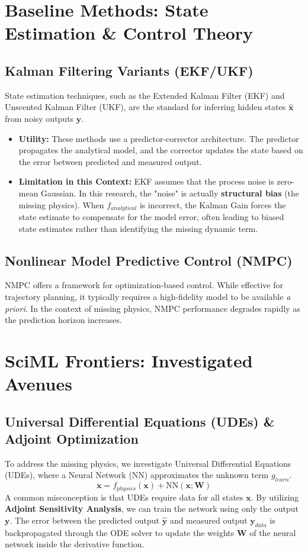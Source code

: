 \documentclass[11pt]{article}
\begin{document}
\section{Baseline Methods: State Estimation \& Control Theory}

\subsection{Kalman Filtering Variants (EKF/UKF)}
State estimation techniques, such as the Extended Kalman Filter (EKF) and Unscented Kalman Filter (UKF), are the standard for inferring hidden states $\hat{\mathbf{x}}$ from noisy outputs $\mathbf{y}$.
\begin{itemize}
    \item \textbf{Utility:} These methods use a predictor-corrector architecture. The predictor propagates the analytical model, and the corrector updates the state based on the error between predicted and measured output.
    \item \textbf{Limitation in this Context:} EKF assumes that the process noise is zero-mean Gaussian. In this research, the "noise" is actually \textbf{structural bias} (the missing physics). When $f_{analytical}$ is incorrect, the Kalman Gain forces the state estimate to compensate for the model error, often leading to biased state estimates rather than identifying the missing dynamic term.
\end{itemize}

\subsection{Nonlinear Model Predictive Control (NMPC)}
NMPC offers a framework for optimization-based control. While effective for trajectory planning, it typically requires a high-fidelity model to be available \textit{a priori}. In the context of missing physics, NMPC performance degrades rapidly as the prediction horizon increases.

\section{SciML Frontiers: Investigated Avenues}

\subsection{Universal Differential Equations (UDEs) \& Adjoint Optimization}
To address the missing physics, we investigate Universal Differential Equations (UDEs), where a Neural Network (NN) approximates the unknown term $g_{learn}$.
\begin{equation}
    \dot{\mathbf{x}} = f_{physics}(\mathbf{x}) + \text{NN}(\mathbf{x}; \mathbf{W})
\end{equation}
A common misconception is that UDEs require data for all states $\mathbf{x}$. By utilizing \textbf{Adjoint Sensitivity Analysis}, we can train the network using only the output $\mathbf{y}$. The error between the predicted output $\hat{\mathbf{y}}$ and measured output $\mathbf{y}_{data}$ is backpropagated through the ODE solver to update the weights $\mathbf{W}$ of the neural network inside the derivative function.
\end{document}
